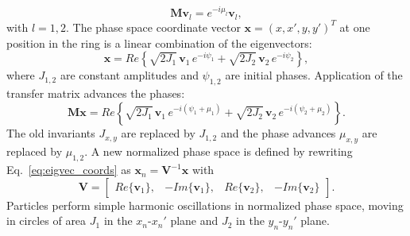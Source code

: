 %
\begin{equation} \label{eq:transfer_matrix_eig}
    \mathbf{M} \mathbf{v}_l = e^{-i\mu_l} \mathbf{v}_l,
\end{equation}
%
with $l = 1,2$. The phase space coordinate vector $\mathbf{x} = (x, x', y, y')^T$ at one position in the ring is a linear combination of the eigenvectors:
%
\begin{equation}
    \mathbf{x} = Re \left\{
        \sqrt{2 J_1} \, \mathbf{v}_1 \, e^{-i\psi_1}
        + \sqrt{2 J_2} \, \mathbf{v}_2 \, e^{-i\psi_2}
    \right\},
\end{equation}
%
where $J_{1,2}$ are constant amplitudes and $\psi_{1,2}$ are initial phases. Application of the transfer matrix advances the phases:
%
\begin{equation}\label{eq:eigvec_coords}
    \mathbf{Mx} = Re \left\{
        \sqrt{2 J_1} \, \mathbf{v}_1 \, e^{-i(\psi_1 + \mu_1)}
        + \sqrt{2 J_2} \, \mathbf{v}_2 \, e^{-i(\psi_2 + \mu_2)}
    \right\}.
\end{equation}
%
The old invariants $J_{x,y}$ are replaced by $J_{1,2}$ and the phase advances $\mu_{x,y}$ are replaced by $\mu_{1,2}$. A new normalized phase space is defined by rewriting Eq.~\eqref{eq:eigvec_coords} as $\mathbf{x}_n = \mathbf{V}^{-1} \mathbf{x}$ with
%
\begin{equation}\label{eq:V_from_eigvecs}
    \mathbf{V} = 
    \begin{bmatrix}
        Re\{\mathbf{v}_1\}, & -Im\{\mathbf{v}_1\}, & Re\{\mathbf{v}_2\}, & -Im\{\mathbf{v}_2\}
    \end{bmatrix}.
\end{equation}
%
Particles perform simple harmonic oscillations in normalized phase space, moving in circles of area $J_1$ in the $x_n$-$x_n'$ plane and $J_2$ in the $y_n$-$y_n'$ plane.

